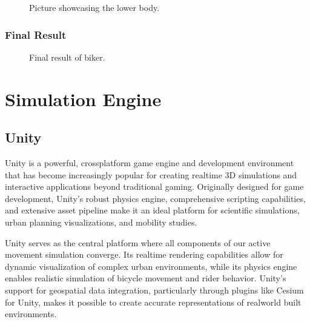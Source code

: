 \documentclass[letterpaper,10pt,english]{jupyterBook}
\begin{document}
\begin{figure}[htbp]
\centering
\capstart

\noindent{}
\caption{Picture showcasing the lower body.}\label{\detokenize{Biker:biker-bot}}\end{figure}


\subsection{Final Result}
\label{\detokenize{Biker:final-result}}
\begin{figure}[htbp]
\centering
\capstart

\noindent{}
\caption{Final result of biker.}\label{\detokenize{Biker:biker-all}}\end{figure}

\sphinxstepscope


\chapter{Simulation Engine}
\label{\detokenize{Unity:simulation-engine}}\label{\detokenize{Unity::doc}}

\section{Unity}
\label{\detokenize{Unity:unity}}
\sphinxAtStartPar
Unity is a powerful, cross\sphinxhyphen{}platform game engine and development environment that has become increasingly popular for creating real\sphinxhyphen{}time 3D simulations and interactive applications beyond traditional gaming. Originally designed for game development, Unity’s robust physics engine, comprehensive scripting capabilities, and extensive asset pipeline make it an ideal platform for scientific simulations, urban planning visualizations, and mobility studies.

\sphinxAtStartPar
Unity serves as the central platform where all components of our active movement simulation converge. Its real\sphinxhyphen{}time rendering capabilities allow for dynamic visualization of complex urban environments, while its physics engine enables realistic simulation of bicycle movement and rider behavior. Unity’s support for geospatial data integration, particularly through plugins like Cesium for Unity, makes it possible to create accurate representations of real\sphinxhyphen{}world built environments.
\end{document}
